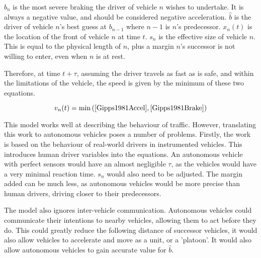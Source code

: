 $b_n$ is the most severe braking the driver of vehicle $n$ wishes to undertake. It is always a negative value, and should be considered negative acceleration. $\hat{b}$ is the driver of vehicle $n$'s best guess at $b_{n-1}$ where $n-1$ is $n$'s predecessor. $x_n(t)$ is the location of the front of vehicle $n$ at time $t$. $s_n$ is the effective size of vehicle $n$. This is equal to the physical length of $n$, plus a margin $n$'s successor is not willing to enter, even when $n$ is at rest.

Therefore, at time $t + \tau$, assuming the driver travels as fast as is safe, and within the limitations of the vehicle, the speed is given by the minimum of these two equations.

\begin{equation}
v_n(t) = \min{(\eqref{Gipps1981Accel},\eqref{Gipps1981Brake})}
\end{equation}

This model works well at describing the behaviour of traffic. However, translating this work to autonomous vehicles poses a number of problems. Firstly, the work is based on the behaviour of real-world drivers in instrumented vehicles. This introduces human driver variables into the equations. An autonomous vehicle with perfect sensors would have an almost negligible $\tau$, as the vehicles would have a very minimal reaction time. $s_n$ would also need to be adjusted. The margin added can be much less, as autonomous vehicles would be more precise than human drivers, driving closer to their predecessors. 

The model also ignores inter-vehicle communication. Autonomous vehicles could communicate their intentions to nearby vehicles, allowing them to act before they do. This could greatly reduce the following distance of successor vehicles, it would also allow vehicles to accelerate and move as a unit, or a 'platoon'. It would also allow autonomous vehicles to gain accurate value for $\hat{b}$.


